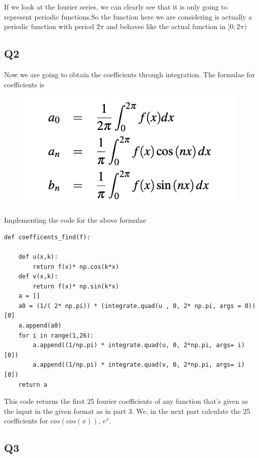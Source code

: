 \documentclass[12pt, a4paper]{report}
\begin{document}
If we look at the fourier series, we can clearly see that it is only going to represent periodic functions.So the function here we are considering is actually a periodic function with period $2\pi$ and behaves like the actual function in $ [0,2\pi) $
 \subsection{Q2}
Now we are going to obtain the coefficients through integration. The formulae for coefficients is 

\begin{figure}[!tbh]
   	\centering
   	\includegraphics[scale=0.75]{1.png}
   	\label{fig:errorbars}
\end{figure}

Implementing the code for the above formulae

\begin{Verbatim}
def coefficents_find(f):

    def u(x,k):
        return f(x)* np.cos(k*x)
    def v(x,k):
        return f(x)* np.sin(k*x) 
    a = []
    a0 = (1/( 2* np.pi)) * (integrate.quad(u , 0, 2* np.pi, args = 0))[0]
    a.append(a0)
    for i in range(1,26):
        a.append((1/np.pi) * integrate.quad(u, 0, 2*np.pi, args= i)[0]) 
        a.append((1/np.pi) * integrate.quad(v, 0, 2*np.pi, args= i)[0])
    return a

\end{Verbatim}

This code returns the first 25 fourier coefficients of any function that's given as the input in the given format as in part 3. We, in the next part calculate the 25 coefficients for $cos(cos(x))$, $e^x$.
   
 \subsection{Q3}
 
\end{document}
